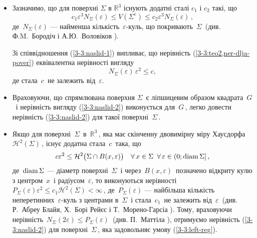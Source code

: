 \documentclass[11pt, reqno]{amsart}
\begin{document}
\begin{itemize}
\item 
Зазначимо, що для поверхні $\Sigma$ в $\mathbb{R}^3$
існують додатні сталі $c_1$ і $c_2$ такі, що
\begin{equation}\label{3-3:naslid-1}
c_1\varepsilon^3N_{\Sigma}(\varepsilon)\leq
V(\Sigma^\varepsilon)\leq
c_2\varepsilon^3N_{\Sigma}(\varepsilon)\,,
\end{equation}
де\, $N_{\Sigma}(\varepsilon)$ ---  найменша кількість\,
$\varepsilon$-куль, що покривають\, $\Sigma$\, (див.
Ф.M.~Бородіч і А.Ю.~Воловіков \cite{Borodich}).

Зі співвідношення (\ref{3-3:naslid-1}) випливає, що нерівність
(\ref{3-3:teo2,ner-dlja-pover}) еквівалентна нерівності вигляду
\begin{equation}\label{3-3:naslid-2}
N_{\Sigma}(\varepsilon)\,\varepsilon^2\leq c,
\end{equation}
де стала\, $c$\, не залежить від\, $\varepsilon$.

\item 
Враховуючи, що спрямлювана поверхня $\Sigma$\,  є
ліпшицевим образом квадрата\, $G$\, і нерівність вигляду
(\ref{3-3:naslid-2}) виконується для\, $G$\,,
легко довести нерівність (\ref{3-3:naslid-2}) для такої поверхні\,
$\Sigma$\,.

\item 
Якщо для поверхні\, $\Sigma$\, в\, $\mathbb{R}^3$\,, яка має
скінченну двовимірну міру Хаусдорфа\, $\mathcal{H}^2(\Sigma)$\,, 
існує додатна стала\, $c$\, така, що
\begin{equation}\label{3-3:left-reg}
c \varepsilon^2\leq\mathcal{H}^2\big(\Sigma\cap
B(x,\varepsilon)\big) \quad
\forall\,x\in\Sigma\,\,\,\forall\,\varepsilon\in(0;{\rm
diam}\,\Sigma]\,,
\end{equation}
де\, ${\rm diam}\,\Sigma$ --- діаметр поверхні\, $\Sigma$\,
і через\, $B(x,\varepsilon)$\, позначено відкриту кулю з центром\,
$x$\, і радіусом\, $\varepsilon$, то виконуються нерівності\,
$P_\Sigma(\varepsilon)\varepsilon^2\leq
c_1\mathcal{H}^2(\Sigma)<\infty$\,, де\,
$P_\Sigma(\varepsilon)$ ---
найбільша кількість неперетинних\,
$\varepsilon$-куль з центрами в\, $\Sigma$\, і стала\, $c_1$\, не залежить від\, $\varepsilon$\, (див.
Р.~Абреу Блайя, Х.~Борі Рейєс і Т.~Морено-Гарсіа
\cite[с.~309]{Abreu-Bory-Moreno-3-3}). Тому, враховуючи нерівність\, $N_{\Sigma}(2\varepsilon)\leq
P_\Sigma(\varepsilon)$\, (див. П.~Маттіла
\cite[с.~78]{Mattila}), отримуємо нерівність 
(\ref{3-3:naslid-2}) для поверхні\, $\Sigma$\,, яка задовольняє умову (\ref{3-3:left-reg}).
\end{itemize}
\end{document}
